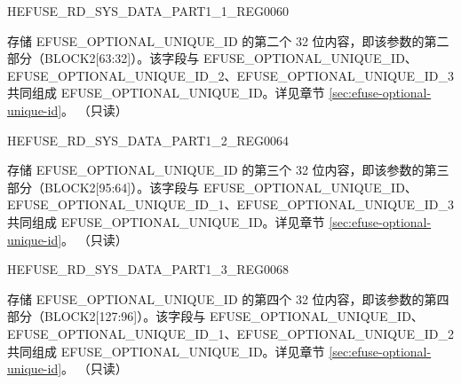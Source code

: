 \begin{register}{H}{EFUSE\_RD\_SYS\_DATA\_PART1\_1\_REG}{\hexprefix{}0060}\label{regdesc:EFUSERDSYSDATAPART11REG}
%
\regnewline%
\begin{regdesc}\begin{reglist}
\label{fielddesc:EFUSEOPTIONALUNIQUEID1}\item [EFUSE\_OPTIONAL\_UNIQUE\_ID\_1] 存储 EFUSE\_OPTIONAL\_UNIQUE\_ID 的第二个 32 位内容，即该参数的第二部分（BLOCK2[63:32]）。该字段与 EFUSE\_OPTIONAL\_UNIQUE\_ID、EFUSE\_OPTIONAL\_UNIQUE\_ID\_2、EFUSE\_OPTIONAL\_UNIQUE\_ID\_3 共同组成 EFUSE\_OPTIONAL\_UNIQUE\_ID。详见章节 \ref{sec:efuse-optional-unique-id}。 （只读）
\end{reglist}\end{regdesc}
\end{register}


\begin{register}{H}{EFUSE\_RD\_SYS\_DATA\_PART1\_2\_REG}{\hexprefix{}0064}\label{regdesc:EFUSERDSYSDATAPART12REG}
%
\regnewline%
\begin{regdesc}\begin{reglist}
\label{fielddesc:EFUSEOPTIONALUNIQUEID2}\item [EFUSE\_OPTIONAL\_UNIQUE\_ID\_2] 存储 EFUSE\_OPTIONAL\_UNIQUE\_ID 的第三个 32 位内容，即该参数的第三部分（BLOCK2[95:64]）。该字段与 EFUSE\_OPTIONAL\_UNIQUE\_ID、EFUSE\_OPTIONAL\_UNIQUE\_ID\_1、EFUSE\_OPTIONAL\_UNIQUE\_ID\_3 共同组成 EFUSE\_OPTIONAL\_UNIQUE\_ID。详见章节 \ref{sec:efuse-optional-unique-id}。 （只读）
\end{reglist}\end{regdesc}
\end{register}


\begin{register}{H}{EFUSE\_RD\_SYS\_DATA\_PART1\_3\_REG}{\hexprefix{}0068}\label{regdesc:EFUSERDSYSDATAPART13REG}
%
\regnewline%
\begin{regdesc}\begin{reglist}
\label{fielddesc:EFUSEOPTIONALUNIQUEID3}\item [EFUSE\_OPTIONAL\_UNIQUE\_ID\_3] 存储 EFUSE\_OPTIONAL\_UNIQUE\_ID 的第四个 32 位内容，即该参数的第四部分（BLOCK2[127:96]）。该字段与 EFUSE\_OPTIONAL\_UNIQUE\_ID、EFUSE\_OPTIONAL\_UNIQUE\_ID\_1、EFUSE\_OPTIONAL\_UNIQUE\_ID\_2 共同组成 EFUSE\_OPTIONAL\_UNIQUE\_ID。详见章节 \ref{sec:efuse-optional-unique-id}。 （只读）
\end{reglist}\end{regdesc}
\end{register}


